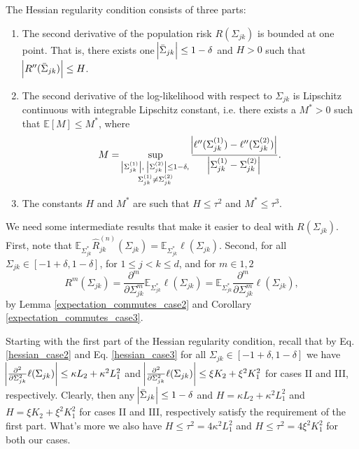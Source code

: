 \begin{condition}
    The Hessian regularity condition consists of three parts:
    \begin{enumerate}
        \item The second derivative of the population risk $R(\Sigma_{jk})$ is bounded at one point. That is, there exists one $\abs{\Bar{\Sigma}_{jk}} \leq 1- \delta$ and $H > 0$ such that $\abs{R^{\prime\prime}(\Bar{\Sigma}_{jk})} \leq H$.
        \item The second derivative of the log-likelihood with respect to $\Sigma_{jk}$ is Lipschitz continuous with integrable Lipschitz constant, i.e. there exists a $M^* > 0$ such that $\mathbb{E}[M] \leq M^*$, where
        \begin{equation*}
            M = \sup_{\substack{\abs{\Sigma_{jk}^{(1)}}, \  \abs{\Sigma_{jk}^{(2)}} \leq 1- \delta, \\ \Sigma_{jk}^{(1)} \neq \Sigma_{jk}^{(2)}}} \frac{\abs{\ell^{\prime\prime}(\Sigma_{jk}^{(1)}) - \ell^{\prime\prime}(\Sigma_{jk}^{(2)})}}{\abs{\Sigma_{jk}^{(1)} - \Sigma_{jk}^{(2)}}}.
        \end{equation*}
        \item The constants $H$ and $M^*$ are such that $H \leq \tau^2$ and $M^*\leq \tau^3$.
    \end{enumerate}
    We need some intermediate results that make it easier to deal with $R(\Sigma_{jk})$. First, note that $\mathbb{E}_{\Sigma_{jk}^*}\hat{R}_{jk}^{(n)}(\Sigma_{jk}) = \mathbb{E}_{\Sigma_{jk}^*}\ell(\Sigma_{jk})$. Second, for all $\Sigma_{jk} \in [-1+\delta, 1-\delta]$, for $1\leq j < k \leq d$, and for $m \in {1,2}$
    \begin{equation*}
        R^m(\Sigma_{jk}) = \frac{\partial^m}{\partial\Sigma_{jk}^m}\mathbb{E}_{\Sigma_{jk}^*}\ell(\Sigma_{jk}) = \mathbb{E}_{\Sigma_{jk}^*}\frac{\partial^m}{\partial\Sigma_{jk}^m}\ell(\Sigma_{jk}),
    \end{equation*}
    by Lemma \ref{expectation_commutes_case2} and Corollary \ref{expectation_commutes_case3}.

    Starting with the first part of the Hessian regularity condition, recall that by Eq. \eqref{hessian_case2} and Eq. \eqref{hessian_case3} for all $\Sigma_{jk} \in [-1+\delta, 1-\delta]$ we have $\abs{\frac{\partial^2}{\partial\Sigma_{jk}^2}\ell(\Sigma_{jk})} \leq \kappa L_2 + \kappa^2L_1^2$ and $\abs{\frac{\partial^2}{\partial\Sigma_{jk}^2}\ell(\Sigma_{jk})} \leq \xi K_2 + \xi^2K_1^2$ for cases II and III, respectively. Clearly, then any $\abs{\Bar{\Sigma}_{jk}} \leq 1-\delta$ and $H = \kappa L_2 + \kappa^2L_1^2$ and $H = \xi K_2 + \xi^2K_1^2$ for cases II and III, respectively satisfy the requirement of the first part. What's more we also have $H \leq \tau^2 = 4\kappa^2L_1^2$ and $H \leq \tau^2 = 4\xi^2K_1^2$ for both our cases. 
    

\end{condition}
